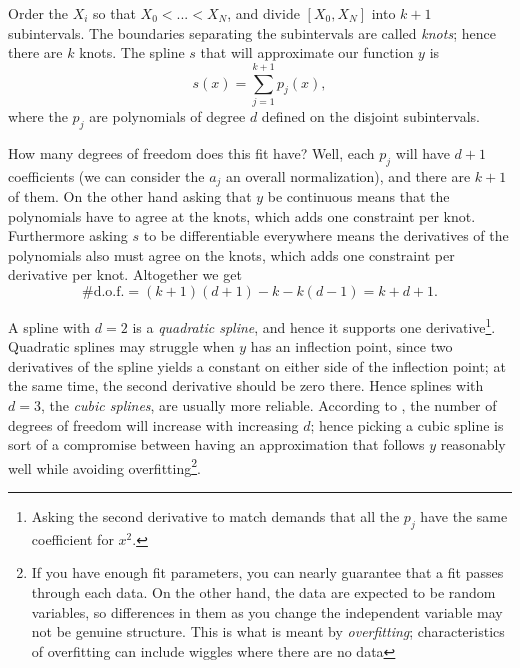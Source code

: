 Order the $X_i$ so that $X_0<...<X_N$, and divide $[X_0,X_N]$ into $k+1$
subintervals. The boundaries separating the subintervals are called {\it
knots}; hence there are $k$ knots. The spline $s$ that will
approximate our function $y$ is
\begin{equation}
s(x) = \sum_{j=1}^{k+1} p_j(x),
\end{equation}
where the $p_j$ are polynomials of degree $d$ defined on the disjoint 
subintervals.

How many degrees of freedom does this fit have? Well, each $p_j$ will have $d+1$
coefficients (we can consider the $a_j$ an overall normalization), and there are
$k+1$ of them. On the other hand asking that $y$ be continuous means that the
polynomials have to agree at the knots, which adds one constraint per knot. 
Furthermore asking $s$ to be differentiable everywhere means the derivatives of 
the polynomials also must agree on the knots, which adds one constraint per
derivative per knot. Altogether we get
\begin{equation}\label{eq:splinedof}
\text{\# d.o.f.} = (k+1)(d+1)-k-k(d-1) = k + d + 1.
\end{equation}

A spline with $d=2$ is a {\it quadratic spline}, 
and hence it supports one derivative\footnote{Asking the second derivative to
match demands that all the $p_j$ have the same coefficient for $x^2$.}.
Quadratic splines may struggle when $y$ has an inflection point, since two
derivatives of the spline yields a constant on either side of the inflection
point; at the same time, the second derivative should be zero there. 
Hence splines with $d=3$, the {\it cubic splines}, are
usually more reliable. According to , the number of
degrees of freedom will increase with increasing $d$; hence picking a cubic
spline is sort of a compromise between having an approximation that follows $y$
reasonably well while avoiding overfitting\footnote{If you have enough fit
parameters, you can nearly guarantee that a fit passes through each data.
On the other hand, the data are expected to be random variables, so
differences in them as you change the independent variable may not be
genuine structure. This is what is meant by {\it
overfitting}; characteristics of overfitting can
include wiggles where there are no data}.

